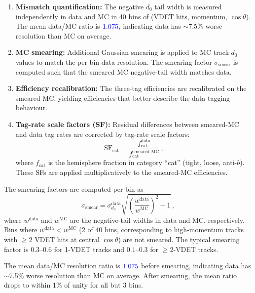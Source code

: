 \documentclass[11pt,a4paper]{article}
\newcommand{\measured}[1]{\textcolor{blue}{#1}}
\begin{document}
\begin{enumerate}
\item \textbf{Mismatch quantification:}
  The negative $d_0$ tail width is measured independently in data
  and MC in 40 bins of (VDET hits, momentum, $\cos\theta$).
  The mean data/MC ratio is $\measured{1.075}$, indicating data
  has $\sim$7.5\% worse resolution than MC on average.

\item \textbf{MC smearing:}
  Additional Gaussian smearing is applied to MC track $d_0$ values
  to match the per-bin data resolution. The smearing factor
  $\sigma_\text{smear}$ is computed such that the smeared MC
  negative-tail width matches data.

\item \textbf{Efficiency recalibration:}
  The three-tag efficiencies are recalibrated on the smeared MC,
  yielding efficiencies that better describe the data tagging
  behaviour.

\item \textbf{Tag-rate scale factors (SF):}
  Residual differences between smeared-MC and data tag rates are
  corrected by tag-rate scale factors:
  \begin{equation}
  \text{SF}_\text{cat} = \frac{f_\text{cat}^\text{data}}
    {f_\text{cat}^\text{smeared MC}}\,,
  \label{eq:tag_rate_sf}
  \end{equation}
  where $f_\text{cat}$ is the hemisphere fraction in category
  ``cat'' (tight, loose, anti-$b$).
  These SFs are applied multiplicatively to the smeared-MC
  efficiencies.
\end{enumerate}

The smearing factors are computed per bin as
\begin{equation}
\sigma_\text{smear} = \sigma_{d_0}^\text{data}
\sqrt{\left(\frac{w^\text{data}}{w^\text{MC}}\right)^2 - 1}\,,
\label{eq:smear_factor}
\end{equation}
where $w^\text{data}$ and $w^\text{MC}$ are the negative-tail
widths in data and MC, respectively.
Bins where $w^\text{data} < w^\text{MC}$ (2 of 40 bins,
corresponding to high-momentum tracks with $\geq 2$ VDET hits
at central $\cos\theta$) are not smeared.
The typical smearing factor is $0.3$--$0.6$ for 1-VDET tracks
and $0.1$--$0.3$ for $\geq$2-VDET tracks.

The mean data/MC resolution ratio is $\measured{1.075}$ before
smearing, indicating data has $\sim$7.5\% worse resolution than
MC on average.
After smearing, the mean ratio drops to within 1\% of unity
for all but 3 bins.
\end{document}
